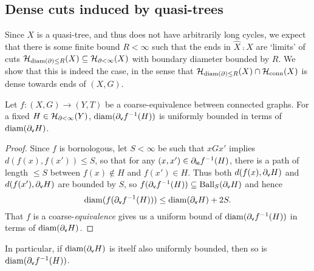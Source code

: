 \documentclass[reqno]{amsart}
\begin{document}
    \subsection{Dense cuts induced by quasi-trees}\label{sec:dense_cuts_induced_by_quasi-trees}

    Since $X$ is a quasi-tree, and thus does not have arbitrarily long cycles, we expect that there is some finite bound $R<\infty$ such that the ends in $\widehat{X}\comp X$ are `limits' of cuts $\mathcal{H}_{\operatorname{diam}(\partial)\leq R}(X)\subseteq\mathcal{H}_{\partial<\infty}(X)$ with boundary diameter bounded by $R$. We show that this is indeed the case, in the sense that $\mathcal{H}_{\operatorname{diam}(\partial)\leq R}(X)\cap\mathcal{H}_\mathrm{conn}(X)$ is dense towards ends of $(X,G)$.

    \begin{lemma}\label{lem:coarse_equivalence_controls_boundary_diameter}
        Let $f:(X,G)\to(Y,T)$ be a coarse-equivalence between connected graphs. For a fixed $H\in\mathcal{H}_{\partial<\infty}(Y)$, $\operatorname{diam}(\partial_\mathsf{v}f^{-1}(H))$ is uniformly bounded in terms of $\operatorname{diam}(\partial_\mathsf{v}H)$.
    \end{lemma}
    \begin{proof}
        Since $f$ is bornologous, let $S<\infty$ be such that $xGx'$ implies $d(f(x),f(x'))\leq S$, so that for any $(x,x')\in\partial_\mathsf{ie}f^{-1}(H)$, there is a path of length $\leq S$ between $f(x)\not\in H$ and $f(x')\in H$. Thus both $d(f(x),\partial_\mathsf{v}H)$ and $d(f(x'),\partial_\mathsf{v}H)$ are bounded by $S$, so $f(\partial_\mathsf{v}f^{-1}(H))\subseteq\operatorname{Ball}_S(\partial_\mathsf{v}H)$ and hence
        \begin{equation*}
            \operatorname{diam}(f(\partial_\mathsf{v}f^{-1}(H)))\leq\operatorname{diam}(\partial_\mathsf{v}H)+2S.
        \end{equation*}
        That $f$ is a coarse-\textit{equivalence} gives us a uniform bound of $\operatorname{diam}(\partial_\mathsf{v}f^{-1}(H))$ in terms of $\operatorname{diam}(\partial_\mathsf{v}H)$.
    \end{proof}

    In particular, if $\operatorname{diam}(\partial_\mathsf{v}H)$ is itself also uniformly bounded, then so is $\operatorname{diam}(\partial_\mathsf{v}f^{-1}(H))$.
\end{document}
